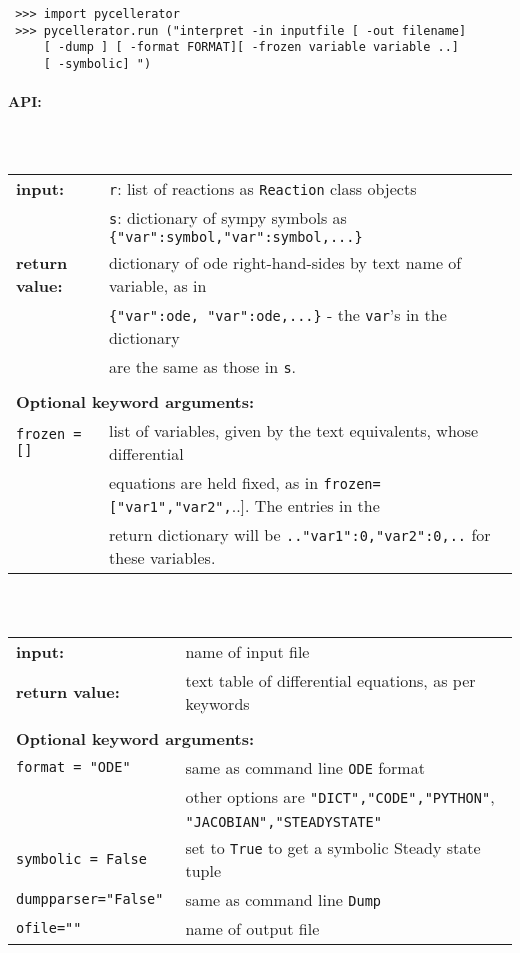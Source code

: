 \begin{lstlisting}
 >>> import pycellerator
 >>> pycellerator.run ("interpret -in inputfile [ -out filename]
	 [ -dump ] [ -format FORMAT][ -frozen variable variable ..]
	 [ -symbolic] ")
\end{lstlisting}



\paragraph{API:\\}

\subparagraph {\\}

\begin{tabular}{ll}
\textbf{input:} & {\tt r}: list of reactions as {\tt Reaction} class objects\\
 & {\tt s}: dictionary of sympy symbols as \verb!{"var":symbol,"var":symbol,...}!\\

\textbf{return value:}& dictionary of ode right-hand-sides by text name of variable, as in \\
& \verb!{"var":ode, "var":ode,...}! - the {\tt var}'s in the dictionary\\
& are the same as those in {\tt s}. \\ \\
\multicolumn{2}{l}{\textbf{Optional keyword arguments:}}\\
\tt{frozen = []} & list of variables, given by the text equivalents, whose differential \\
& equations are held fixed, as in \verb.frozen=["var1","var2",...]. The entries in the \\
& return dictionary will be \verb!.."var1":0,"var2":0,..! for these variables.
\end{tabular}
\clearpage

\subparagraph{\\}

\begin{tabular}{ll}
\textbf{input:} & name of input file \\
\textbf{return value:}& text table of differential equations, as per keywords \\  \\
\multicolumn{2}{l}{\textbf{Optional keyword arguments:}}\\
\tt{format = "ODE"} & same as command line {\tt ODE} format\\
& other options are {\tt "DICT","CODE","PYTHON"},\\ &{\tt "JACOBIAN","STEADYSTATE"}\\
\tt{symbolic = False} & set to {\tt True} to get a symbolic Steady state tuple\\
\tt{dumpparser="False"} &  same as command line {\tt Dump} \\
\tt{ofile=""} & name of output file
\end{tabular}



